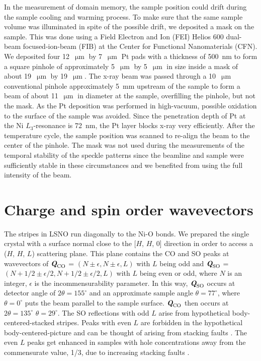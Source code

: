 \documentclass[aps,prl,showpacs,floatfix,onecolumn,superscriptaddress,longbibliography,notitlepage]{revtex4-1}
\def\mathbi#1{\ensuremath{\textbf{\em #1}}}
\def\QCO{\ensuremath{\mathbi{Q}_{\mathrm{CO}}}}
\def\QSO{\ensuremath{\mathbi{Q}_{\mathrm{SO}}}}
\def\um{\ensuremath{\upmu\text{m}}}
\begin{document}
In the measurement of domain memory, the sample position could drift during the sample cooling and warming process. To make sure that the same sample volume was illuminated in spite of the possible drift, we deposited a mask on the sample. This was done using a Field Electron and Ion (FEI) Helios 600 dual-beam focused-ion-beam (FIB) at the Center for Functional Nanomaterials (CFN). We deposited four 12~{\um} by 7~{\um} Pt pads with a thickness of 500~nm to form a square pinhole of approximately 5~{\um} by 5~{\um} in size inside a mask of about 19~{\um} by 19~{\um}. The x-ray beam was passed through a 10~{\um} conventional pinhole approximately 5~mm upstream of the sample to form a beam of about 11~{\um} in diameter at the sample, overfilling the pinhole, but not the mask. As the Pt deposition was performed in high-vacuum, possible oxidation to the surface of the sample was avoided. Since the penetration depth of Pt at the Ni $L_3$-resonance is 72~nm, the Pt layer blocks x-ray very efficiently. After the temperature cycle, the sample position was scanned to re-align the beam to the center of the pinhole. The mask was not used during the measurements of the temporal stability of the speckle patterns since the beamline and sample were sufficiently stable in these circumstances and we benefited from using the full intensity of the beam. 

\section{Charge and spin order wavevectors}

The stripes in \gls{LSNO} run diagonally to the Ni-O bonds. We prepared the single crystal with a surface normal close to the [$H$, $H$, 0] direction in order to access a ($H$, $H$, $L$) scattering plane. This plane contains the \gls{CO} and \gls{SO} peaks at wavevectors of {\QCO} = $(N\pm\epsilon, N\pm\epsilon, L)$ with $L$ being odd and {\QSO} = $(N+1/2\pm\epsilon/2, N+1/2\pm\epsilon/2, L)$ with $L$ being even or odd, where $N$ is an integer, $\epsilon$ is the incommensurability parameter. In this way, {\QSO} occurs at detector angle of $2\theta=155^{\circ}$ and an approximate sample angle $\theta=77^{\circ}$, where $\theta=0^{\circ}$ puts the beam parallel to the sample surface. {\QCO} then occurs at  $2\theta=135^{\circ}$ $\theta=29^{\circ}$. The \gls{SO} reflections with odd $L$ arise from hypothetical body-centered-stacked stripes. Peaks with even $L$ are forbidden in the hypothetical body-centered-picture and can be thought of arising from stacking faults  \cite{Lee1997LSNO, Freeman2004LSNO}. The even $L$ peaks get enhanced in samples with hole concentrations away from the commensurate value, 1/3, due to increasing stacking faults \cite{Lee2001LSNO}.
\end{document}

